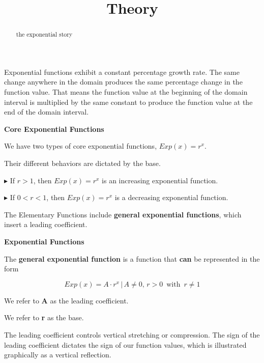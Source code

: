 \documentclass{ximera}
\title{Theory}
\begin{document}
\begin{abstract}
the exponential story
\end{abstract}
\maketitle


Exponential functions exhibit a constant percentage growth rate. The same change anywhere in the domain produces the same percentage change in the function value. That means the function value at the beginning of the domain interval is multiplied by the same constant to produce the function value at the end of the domain interval.

\textbf{Core Exponential Functions}

We have two types of core exponential functions, $Exp(x) = r^x$. 


Their different behaviors are dictated by the base.



$\blacktriangleright$ If $r > 1$, then $Exp(x) = r^x$ is an increasing exponential function.

$\blacktriangleright$ If $0 < r < 1$, then $Exp(x) = r^x$ is a decreasing exponential function.






The Elementary Functions include \textbf{general exponential functions}, which insert a leading coefficient.






\begin{definition} \textbf{\textcolor{green!50!black}{Exponential Functions}}

The \textbf{general exponential function} is a function that \textbf{\textcolor{purple!85!blue}{can}} be represented in the form 

\[  Exp(x) = A \cdot r^x    \, | \,  A \ne 0, \, r > 0 \, \text{ with } \, r \ne 1   \]


We refer to \textbf{\textcolor{purple!85!blue}{A}} as the leading coefficient.

We refer to \textbf{\textcolor{purple!85!blue}{r}} as the base.


\end{definition}





The leading coefficient controls vertical stretching or compression. The sign of the leading coefficient dictates the sign of our function values, which is illustrated graphically as a vertical reflection. 
\end{document}
